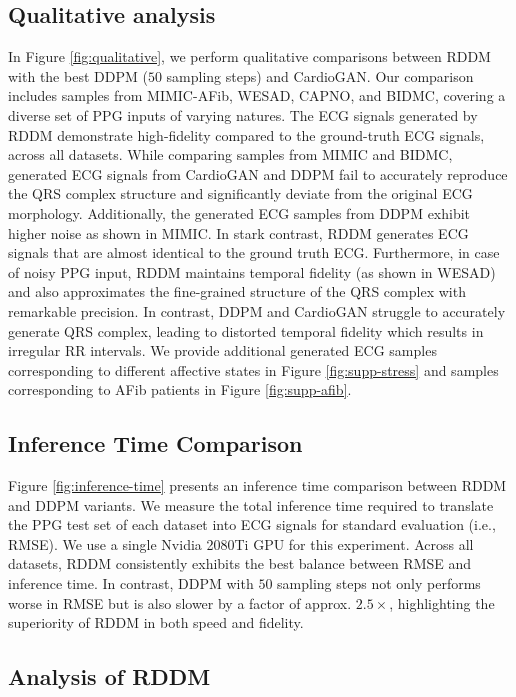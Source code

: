 \documentclass[letterpaper]{article} %
\begin{document}
\subsection{Qualitative analysis}
\label{section:qualitative-analysis}
In Figure \ref{fig:qualitative}, we perform qualitative comparisons between RDDM with the best DDPM ($50$ sampling steps) and CardioGAN. Our comparison includes samples from MIMIC-AFib, WESAD, CAPNO, and BIDMC, covering a diverse set of PPG inputs of varying natures. The ECG signals generated by RDDM demonstrate high-fidelity compared to the ground-truth ECG signals, across all datasets. While comparing samples from MIMIC and BIDMC, generated ECG signals from CardioGAN and DDPM fail to accurately reproduce the QRS complex structure and significantly deviate from the original ECG morphology. Additionally, the generated ECG samples from DDPM exhibit higher noise as shown in MIMIC. In stark contrast, RDDM generates ECG signals that are almost identical to the ground truth ECG. Furthermore, in case of noisy PPG input, RDDM maintains temporal fidelity (as shown in WESAD) and also approximates the fine-grained structure of the QRS complex with remarkable precision. In contrast, DDPM and CardioGAN struggle to accurately generate QRS complex, leading to distorted temporal fidelity which results in irregular RR intervals. We provide additional generated ECG samples corresponding to different affective states in Figure \ref{fig:supp-stress} and samples corresponding to AFib patients in Figure \ref{fig:supp-afib}.


\subsection{Inference Time Comparison}
Figure \ref{fig:inference-time} presents an inference time comparison between RDDM and DDPM variants. We measure the total inference time required to translate the PPG test set of each dataset into ECG signals for standard evaluation (i.e., RMSE). We use a single Nvidia 2080Ti GPU for this experiment. Across all datasets, RDDM consistently exhibits the best balance between RMSE and inference time. In contrast, DDPM with $50$ sampling steps not only performs worse in RMSE but is also slower by a factor of approx. $2.5 \times$, highlighting the superiority of RDDM in both speed and fidelity.


\subsection{Analysis of RDDM}
\label{sec:ablation}
\end{document}

